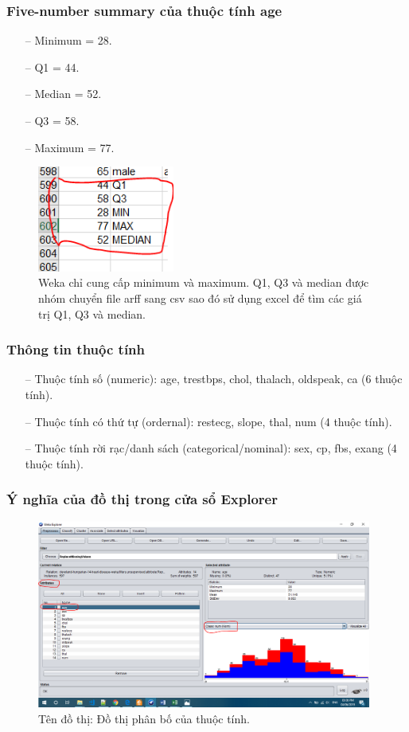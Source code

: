 \subsubsection{Five-number summary của thuộc tính age}
\begin{itemize}
	\item[--]Minimum = 28.
	\item[--]Q1 = 44.
	\item[--]Median = 52.
	\item[--]Q3 = 58.
	\item[--]Maximum = 77.
\end{itemize}
\begin{figure}[H]
\centering
\includegraphics[width=0.4\textwidth]{2/2.png}
\caption{Weka chỉ cung cấp minimum và maximum. Q1, Q3 và median được nhóm chuyển file arff sang csv sao đó sử dụng excel để tìm các giá trị Q1, Q3 và median.}
\end{figure}

\subsubsection{Thông tin thuộc tính}
\begin{itemize}
	\item[--]Thuộc tính số (numeric):  age, trestbps, chol, thalach, oldspeak, ca (6 thuộc tính). 
	\item[--]Thuộc tính có thứ tự (ordernal): restecg, slope, thal, num (4 thuộc tính).
	\item[--]Thuộc tính rời rạc/danh sách (categorical/nominal): sex, cp, fbs, exang (4 thuộc tính).
\end{itemize}

\subsubsection{Ý nghĩa của đồ thị trong cửa sổ Explorer}
\begin{figure}[H]
\centering
\includegraphics[width=0.98\textwidth]{2/3.png}
\caption{Tên đồ thị: Đồ thị phân bố của thuộc tính.}
\end{figure}

